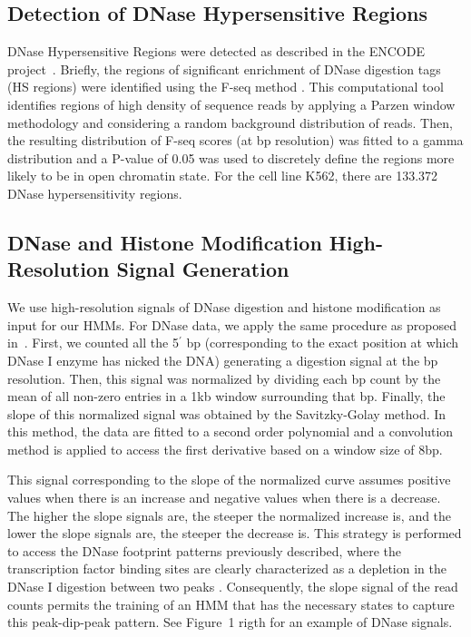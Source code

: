 \documentclass[runningheads,a4paper]{llncs}
\begin{document}
\subsection{Detection of DNase Hypersensitive Regions\label{sc:dhr}}

DNase Hypersensitive Regions were detected as described in the ENCODE
project~\cite{encode2012}. Briefly, the regions of significant
enrichment of DNase digestion tags (HS regions) were identified using
the F-seq method \cite{boyle2008b}. This computational tool identifies
regions of high density of sequence reads by applying a Parzen window
methodology and considering a random background distribution of reads.
Then, the resulting distribution of F-seq scores (at bp resolution)
was fitted to a gamma distribution and a P-value of 0.05 was used to
discretely define the regions more likely to be in open chromatin
state. For the cell line K562, there are 133.372 DNase
hypersensitivity regions.

\subsection{DNase and Histone Modification High-Resolution Signal Generation\label{sc:hrs}}

We use high-resolution signals of DNase digestion and histone
modification as input for our HMMs. For DNase data, we apply the same
procedure as proposed in~\cite{boyle2011}.  First, we counted all the
5$^\prime$ bp (corresponding to the exact position at which DNase I enzyme
has nicked the DNA) generating a digestion signal at the bp
resolution. Then, this signal was normalized by dividing each bp count
by the mean of all non-zero entries in a 1kb window surrounding that
bp. Finally, the slope of this normalized signal was obtained by the
Savitzky-Golay method. In this method, the data are fitted to a second
order polynomial and a convolution method is applied to access the
first derivative based on a window size of 8bp.

This signal corresponding to the slope of the normalized curve assumes
positive values when there is an increase and negative values when
there is a decrease. The higher the slope signals are, the steeper the normalized
increase is, and the lower the slope signals are, the steeper the decrease is. 
This strategy is performed to access the
DNase footprint patterns previously described, where the transcription
factor binding sites are clearly characterized as a depletion in the
DNase I digestion between two peaks \cite{boyle2011}. Consequently,
the slope signal of the read counts permits the
training of an HMM that has the necessary states to capture this
peak-dip-peak pattern. See Figure~1 rigth for an example of DNase
signals.
\end{document}
